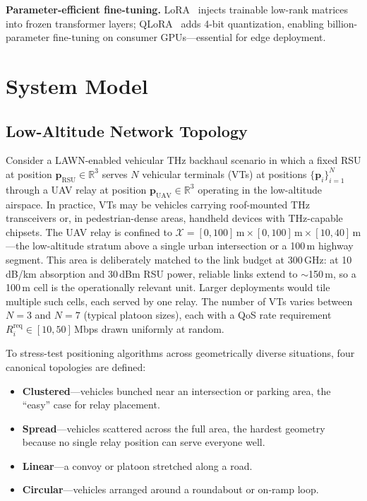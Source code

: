 \documentclass[journal]{IEEEtran}
\begin{document}
\textbf{Parameter-efficient fine-tuning.}
LoRA~\cite{hu2022lora} injects trainable low-rank matrices into frozen transformer layers; QLoRA~\cite{dettmers2023qlora} adds 4-bit quantization, enabling billion-parameter fine-tuning on consumer GPUs---essential for edge deployment.


\section{System Model}
\label{sec:system}

\subsection{Low-Altitude Network Topology}

Consider a LAWN-enabled vehicular THz backhaul scenario in which a fixed RSU at position $\mathbf{p}_\text{RSU} \in \mathbb{R}^3$ serves $N$ vehicular terminals (VTs) at positions $\{\mathbf{p}_i\}_{i=1}^{N}$ through a UAV relay at position $\mathbf{p}_\text{UAV} \in \mathbb{R}^3$ operating in the low-altitude airspace. In practice, VTs may be vehicles carrying roof-mounted THz transceivers or, in pedestrian-dense areas, handheld devices with THz-capable chipsets. The UAV relay is confined to $\mathcal{X} = [0, 100]\,\text{m} \times [0, 100]\,\text{m} \times [10, 40]\,\text{m}$---the low-altitude stratum above a single urban intersection or a 100\,m highway segment. This area is deliberately matched to the link budget at 300\,GHz: at 10\,dB/km absorption and 30\,dBm RSU power, reliable links extend to ${\sim}$150\,m, so a 100\,m cell is the operationally relevant unit. Larger deployments would tile multiple such cells, each served by one relay. The number of VTs varies between $N = 3$ and $N = 7$ (typical platoon sizes), each with a QoS rate requirement $R_i^\text{req} \in [10, 50]$\,Mbps drawn uniformly at random.

To stress-test positioning algorithms across geometrically diverse situations, four canonical topologies are defined:
\begin{itemize}
    \item \textbf{Clustered}---vehicles bunched near an intersection or parking area, the ``easy'' case for relay placement.
    \item \textbf{Spread}---vehicles scattered across the full area, the hardest geometry because no single relay position can serve everyone well.
    \item \textbf{Linear}---a convoy or platoon stretched along a road.
    \item \textbf{Circular}---vehicles arranged around a roundabout or on-ramp loop.
\end{itemize}
\end{document}
